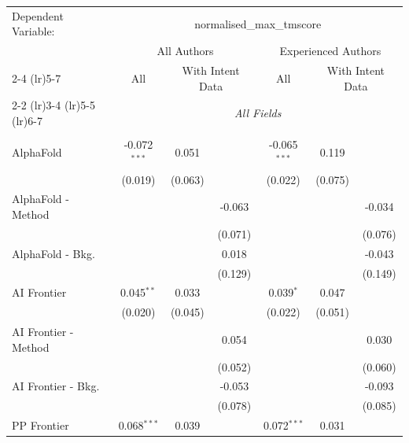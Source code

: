 \begingroup
\centering
\begin{tabular}{lcccccc}
   \tabularnewline \midrule \midrule
   Dependent Variable: & \multicolumn{6}{c}{normalised\_max\_tmscore}\\
 & \multicolumn{3}{c}{All Authors} & \multicolumn{3}{c}{Experienced Authors} \\
\cmidrule(lr){2-4} \cmidrule(lr){5-7}
 & \multicolumn{1}{c}{All} & \multicolumn{2}{c}{With Intent Data} & \multicolumn{1}{c}{All} & \multicolumn{2}{c}{With Intent Data} \\
\cmidrule(lr){2-2} \cmidrule(lr){3-4} \cmidrule(lr){5-5} \cmidrule(lr){6-7}
 & \multicolumn{6}{c}{\textit{All Fields}} \\ \\
   AlphaFold            & -0.072$^{***}$ & 0.051         &         & -0.065$^{***}$ & 0.119        &   \\   
                        & (0.019)        & (0.063)       &         & (0.022)        & (0.075)      &   \\   
   AlphaFold - Method   &                &               & -0.063  &                &              & -0.034\\   
                        &                &               & (0.071) &                &              & (0.076)\\   
   AlphaFold - Bkg.     &                &               & 0.018   &                &              & -0.043\\   
                        &                &               & (0.129) &                &              & (0.149)\\   
   AI Frontier          & 0.045$^{**}$   & 0.033         &         & 0.039$^{*}$    & 0.047        &   \\   
                        & (0.020)        & (0.045)       &         & (0.022)        & (0.051)      &   \\   
   AI Frontier - Method &                &               & 0.054   &                &              & 0.030\\   
                        &                &               & (0.052) &                &              & (0.060)\\   
   AI Frontier - Bkg.   &                &               & -0.053  &                &              & -0.093\\   
                        &                &               & (0.078) &                &              & (0.085)\\   
   PP Frontier          & 0.068$^{***}$  & 0.039         &         & 0.072$^{***}$  & 0.031        &   \\   

\end{tabular}
